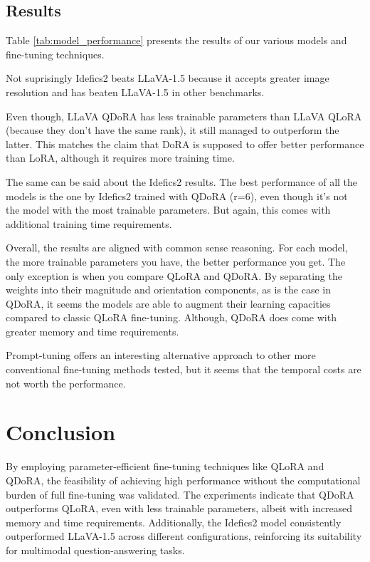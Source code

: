 \documentclass{article}
\begin{document}
\subsection{Results}

Table \ref{tab:model_performance} presents the results of our various models and fine-tuning techniques.


Not suprisingly Idefics2 beats LLaVA-1.5 because it accepts greater image resolution and has beaten LLaVA-1.5 in other benchmarks.\cite{idefics2}

Even though, LLaVA QDoRA has less trainable parameters than LLaVA QLoRA (because they don't have
the same rank), it still managed to outperform the latter. This matches the claim that DoRA
is supposed to offer better performance than LoRA, although it requires more training time.

The same can be said about the Idefics2 results. The best performance of all the models is the one
by Idefics2 trained with QDoRA (r=6), even though it's not the model with the most trainable parameters. But again,
this comes with additional training time requirements.

Overall, the results are aligned with common sense reasoning. For each model, the more trainable parameters you have,
the better performance you get. The only exception is when you compare QLoRA and QDoRA. By separating the weights into
their magnitude and orientation components, as is the case in QDoRA, it seems the models are able
to augment their learning capacities compared to classic QLoRA fine-tuning. Although, QDoRA does come with
greater memory and time requirements.

Prompt-tuning offers an interesting alternative approach to other more conventional fine-tuning methods tested, but it seems
that the temporal costs are not worth the performance.



\section{Conclusion}
\label{sec:conclusion}

By employing parameter-efficient fine-tuning techniques like QLoRA and QDoRA, the feasibility of achieving high performance without the computational burden of full fine-tuning was validated. The experiments indicate that QDoRA outperforms QLoRA, even with less trainable parameters, albeit with increased memory and time requirements. Additionally, the Idefics2 model consistently outperformed LLaVA-1.5 across different configurations, reinforcing its suitability for multimodal question-answering tasks.
\end{document}
